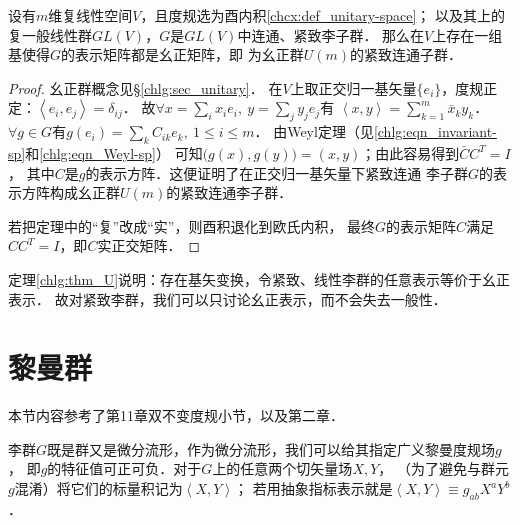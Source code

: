 \begin{theorem}\label{chlg:thm_U}
    设有$m$维复线性空间$V$，且度规选为酉内积\ref{chcx:def_unitary-space}；
    以及其上的复一般线性群$GL(V)$，$G$是$GL(V)$中连通、紧致李子群．
    那么在$V$上存在一组基使得$G$的表示矩阵都是幺正矩阵，即
    为幺正群$U(m)$的紧致连通子群．
\end{theorem}
\begin{proof}
    幺正群概念见\S\ref{chlg:sec_unitary}．
    在$V$上取正交归一基矢量$\{e_i\}$，度规正定：$\left<e_i,e_j\right>=\delta_{ij}$．
    故$\forall x = \sum_i x_i e_i,\ y=\sum_j y_j e_j$有
    $\left<x,y\right>= \sum_{k=1}^{m} \bar{x}_k y_k $．
    $\forall g\in G$有$g(e_i)=\sum_k  C_{ik}e_k, \ 1\leqslant i \leqslant m$．
    由Weyl定理（见\eqref{chlg:eqn_invariant-sp}和\eqref{chlg:eqn_Weyl-sp}）
    可知$\bigl(g(x),g(y)\bigr) = (x,y)$；由此容易得到$\bar{C} C^T = I$，
    其中$C$是$g$的表示方阵．这便证明了在正交归一基矢量下紧致连通
    李子群$G$的表示方阵构成幺正群$U(m)$的紧致连通李子群．
    
    若把定理中的“复”改成“实”，则酉积退化到欧氏内积，
    最终$G$的表示矩阵$C$满足$CC^T=I$，即$C$实正交矩阵．   
\end{proof}

定理\ref{chlg:thm_U}说明：存在基矢变换，令紧致、线性李群的任意表示等价于幺正表示．
故对紧致李群，我们可以只讨论幺正表示，而不会失去一般性．








\section{黎曼群}\label{chlg:sec_bi-invariant-metric}
本节内容参考了\parencite{oneill1983}第11章双不变度规小节，以及\parencite{Alexandrino-2015}第二章．   

李群$G$既是群又是微分流形，作为微分流形，我们可以给其指定广义黎曼度规场$g$，
即$g$的特征值可正可负．对于$G$上的任意两个切矢量场$X,Y$，
（为了避免与群元$g$混淆）将它们的标量积记为$\left<X,Y\right>$；
若用抽象指标表示就是$\left<X,Y\right>\equiv g_{ab}X^a Y^b$．


